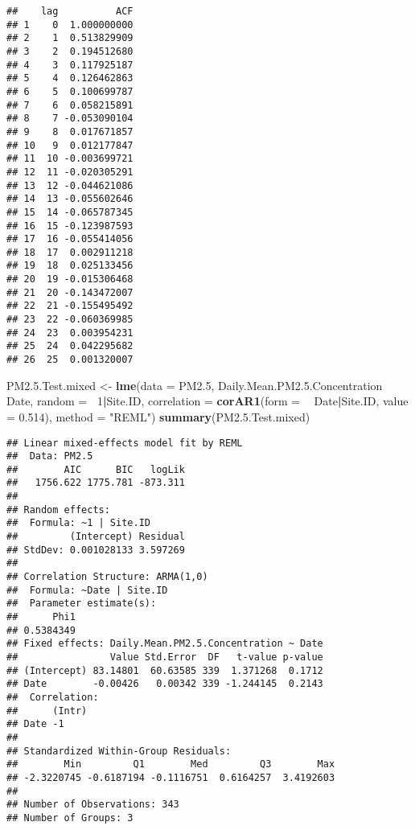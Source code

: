 \documentclass[]{article}
\newenvironment{Shaded}{\begin{snugshade}}{\end{snugshade}}
\newcommand{\KeywordTok}[1]{\textcolor[rgb]{0.13,0.29,0.53}{\textbf{#1}}}
\newcommand{\DataTypeTok}[1]{\textcolor[rgb]{0.13,0.29,0.53}{#1}}
\newcommand{\DecValTok}[1]{\textcolor[rgb]{0.00,0.00,0.81}{#1}}
\newcommand{\FloatTok}[1]{\textcolor[rgb]{0.00,0.00,0.81}{#1}}
\newcommand{\StringTok}[1]{\textcolor[rgb]{0.31,0.60,0.02}{#1}}
\newcommand{\OperatorTok}[1]{\textcolor[rgb]{0.81,0.36,0.00}{\textbf{#1}}}
\newcommand{\NormalTok}[1]{#1}
\begin{document}
\begin{verbatim}
##    lag          ACF
## 1    0  1.000000000
## 2    1  0.513829909
## 3    2  0.194512680
## 4    3  0.117925187
## 5    4  0.126462863
## 6    5  0.100699787
## 7    6  0.058215891
## 8    7 -0.053090104
## 9    8  0.017671857
## 10   9  0.012177847
## 11  10 -0.003699721
## 12  11 -0.020305291
## 13  12 -0.044621086
## 14  13 -0.055602646
## 15  14 -0.065787345
## 16  15 -0.123987593
## 17  16 -0.055414056
## 18  17  0.002911218
## 19  18  0.025133456
## 20  19 -0.015306468
## 21  20 -0.143472007
## 22  21 -0.155495492
## 23  22 -0.060369985
## 24  23  0.003954231
## 25  24  0.042295682
## 26  25  0.001320007
\end{verbatim}

\begin{Shaded}
\begin{Highlighting}[]
\NormalTok{PM2.}\FloatTok{5.}\NormalTok{Test.mixed <-}\StringTok{ }\KeywordTok{lme}\NormalTok{(}\DataTypeTok{data =}\NormalTok{ PM2.}\DecValTok{5}\NormalTok{,}
\NormalTok{                     Daily.Mean.PM2.}\FloatTok{5.}\NormalTok{Concentration }\OperatorTok{~}\StringTok{ }\NormalTok{Date, }\DataTypeTok{random =} \OperatorTok{~}\DecValTok{1}\OperatorTok{|}\NormalTok{Site.ID,}
                     \DataTypeTok{correlation =} \KeywordTok{corAR1}\NormalTok{(}\DataTypeTok{form =} \OperatorTok{~}\StringTok{ }\NormalTok{Date}\OperatorTok{|}\NormalTok{Site.ID, }\DataTypeTok{value =} \FloatTok{0.514}\NormalTok{),}
                     \DataTypeTok{method =} \StringTok{"REML"}\NormalTok{)}
\KeywordTok{summary}\NormalTok{(PM2.}\FloatTok{5.}\NormalTok{Test.mixed)}
\end{Highlighting}
\end{Shaded}

\begin{verbatim}
## Linear mixed-effects model fit by REML
##  Data: PM2.5 
##        AIC      BIC   logLik
##   1756.622 1775.781 -873.311
## 
## Random effects:
##  Formula: ~1 | Site.ID
##         (Intercept) Residual
## StdDev: 0.001028133 3.597269
## 
## Correlation Structure: ARMA(1,0)
##  Formula: ~Date | Site.ID 
##  Parameter estimate(s):
##      Phi1 
## 0.5384349 
## Fixed effects: Daily.Mean.PM2.5.Concentration ~ Date 
##                Value Std.Error  DF   t-value p-value
## (Intercept) 83.14801  60.63585 339  1.371268  0.1712
## Date        -0.00426   0.00342 339 -1.244145  0.2143
##  Correlation: 
##      (Intr)
## Date -1    
## 
## Standardized Within-Group Residuals:
##        Min         Q1        Med         Q3        Max 
## -2.3220745 -0.6187194 -0.1116751  0.6164257  3.4192603 
## 
## Number of Observations: 343
## Number of Groups: 3
\end{verbatim}
\end{document}
